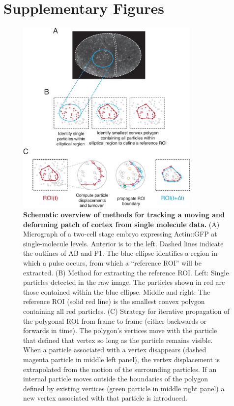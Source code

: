\newpage





\section{Supplementary Figures}

\begin{figure}[!htbp]
\centering
\includegraphics[width=0.8\textwidth]{pulse/Figure2-10}

\caption{\label{fig:2210} \textbf{Schematic overview of methods for tracking a moving and deforming patch of cortex from single molecule data.} (A) Micrograph of a two-cell stage embryo expressing Actin::GFP at single-molecule levels. Anterior is to the left.  Dashed lines indicate the outlines of AB and P1.  The blue ellipse identifies a region in which a pulse occurs, from which a “reference ROI” will be extracted. (B) Method for extracting the reference ROI. Left:  Single particles detected in the raw image.  The particles shown in red are those contained within the blue ellipse.  Middle and right: The reference ROI (solid red line) is the smallest convex polygon containing all red particles. (C) Strategy for iterative propagation of the polygonal ROI from frame to frame (either backwards or forwards in time).  The polygon’s vertices move with the particle that defined that vertex so long as the particle remains visible. When a particle associated with a vertex disappears (dashed magenta particle in middle left panel), the vertex displacement is extrapolated from the motion of the surrounding particles. If an internal particle moves outside the boundaries of the polygon defined by existing vertices (green particle in middle right panel) a new vertex associated with that particle is introduced.}
\end{figure}




